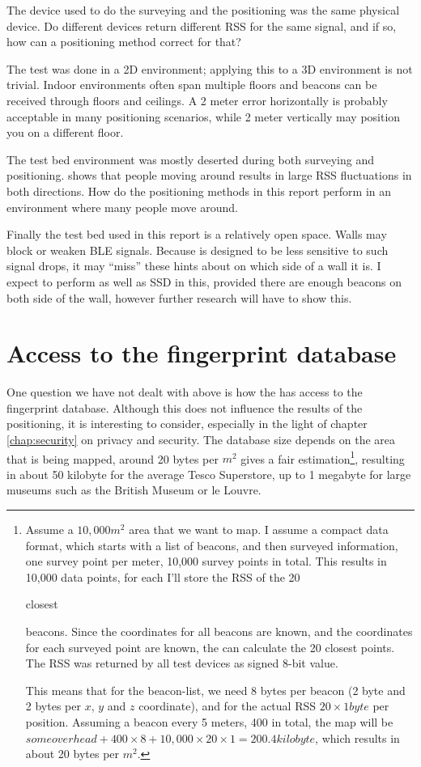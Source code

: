 The device used to do the surveying and the positioning was the same physical device.
Do different devices return different RSS for the same signal, and if so, how can a positioning method correct for that?

The test was done in a 2D environment; applying this to a 3D environment is not trivial.
Indoor environments often span multiple floors and beacons can be received through floors and ceilings.
A 2 meter error horizontally is probably acceptable in many positioning scenarios, while 2 meter vertically may position you on a different floor.

The test bed environment was mostly deserted during both surveying and positioning.
 shows that people moving around results in large RSS fluctuations in both directions.
How do the positioning methods in this report perform in an environment where many people move around.

Finally the test bed used in this report is a relatively open space.
Walls may block or weaken BLE signals.
Because \aBRP is designed to be less sensitive to such signal drops, it may ``miss'' these hints about on which side of a wall it is.
I expect \aBRP to perform as well as SSD in this, provided there are enough beacons on both side of the wall, however further research will have to show this.

\section{Access to the fingerprint database}
\label{sec:architecture-database}
One question we have not dealt with above is how the \device has access to the fingerprint database.
Although this does not influence the results of the positioning, it is interesting to consider, especially in the light of chapter \ref{chap:security} on privacy and security.
The database size depends on the area that is being mapped, around 20 bytes per $m^2$ gives a fair estimation\footnote{Assume a $10,000m^2$ area that we want to map.
    I assume a compact data format, which starts with a list of beacons, and then surveyed information, one survey point per meter, 10,000 survey points in total.
    This results in 10,000 data points, for each I'll store the RSS of the 20 \begin{em}closest\end{em} beacons.
    Since the coordinates for all beacons are known, and the coordinates for each surveyed point are known, the \device can calculate the 20 closest points.
    The RSS was returned by all test devices as signed 8-bit value.

    This means that for the beacon-list, we need 8 bytes per beacon (2 byte \bid and 2 bytes per $x$, $y$ and $z$ coordinate), and for the actual RSS $20 \times 1 byte$ per position.
    Assuming a beacon every 5 meters, 400 in total, the map will be $some overhead + 400 \times 8 + 10,000 \times 20 \times 1 = 200.4 kilobyte$, which results in about 20 bytes per $m^2$.
}, resulting in about 50 kilobyte for the average Tesco Superstore, up to 1 megabyte for large museums such as the British Museum or le Louvre.

